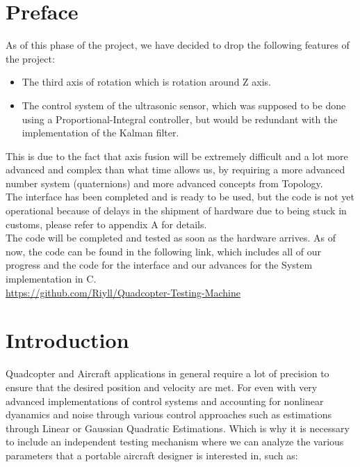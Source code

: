 \documentclass[12pt]{article}
\numberwithin{equation}{section}
\begin{document}
\section*{Preface}
As of this phase of the project, we have decided to drop the following features of the project:
\begin{itemize}
  \item The third axis of rotation which is rotation around Z axis.  
  \item The control system of the ultrasonic sensor, which was supposed to be done using a Proportional-Integral controller, but would be redundant with the implementation of the Kalman filter.
\end{itemize}
This is due to the fact that axis fusion will be extremely difficult and a lot more advanced and complex than what time allows us, by requiring a more advanced number system (quaternions) and more advanced concepts from Topology. \cite{Topology}\\
The interface has been completed and is ready to be used, but the code is not yet operational because of delays in the shipment of hardware due to being stuck in customs, please refer to appendix A for details.\\
The code will be completed and tested as soon as the hardware arrives.
As of now, the code can be found in the following link, which includes all of our progress and the code for the interface and our advances for the System implementation in C. \\
\url{https://github.com/Riyll/Quadcopter-Testing-Machine}

\newpage



\tableofcontents
\newpage
\listoffigures
\newpage

\section{Introduction}

Quadcopter and Aircraft applications in general require a lot of precision to ensure that the desired position and velocity are met. For even with very advanced implementations of control systems and accounting for nonlinear dyanamics and noise through various control approaches such as estimations through Linear or Gaussian Quadratic Estimations. Which is why it is necessary to include an independent testing mechanism where we can analyze the various parameters that a portable aircraft designer is interested in, such as:
\end{document}
